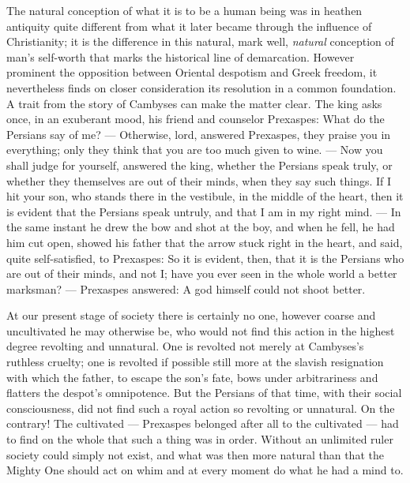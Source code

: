 \documentclass[12pt,a4paper,openany]{book}
\newcommand{\opage}[1]{\marginnote{\footnotesize\textit{[#1]}}}
\begin{document}
The natural conception of what it is to be a human being
was in heathen antiquity quite different from
what it later became through the influence of Christianity; it is
the difference in this natural, mark well, \emph{natural}
conception of man's self-worth that marks the
historical line of demarcation. However prominent the opposition
between Oriental despotism and
Greek freedom, it nevertheless finds on closer
\setcounter{footnote}{0}%
\opage{295}consideration its resolution in a common foundation. A trait
from the story of Cambyses can make the matter clear.
The king asks once, in an exuberant mood, his friend and counselor
Prexaspes: What do the Persians say of me? ---
Otherwise, lord, answered Prexaspes, they praise you in everything;
only they think that you are too much given to wine. ---
Now you shall judge for yourself, answered the king, whether the Persians
speak truly, or whether they themselves are out of their minds, when they
say such things. If I hit your son, who stands
there in the vestibule, in the middle of the heart, then it is evident that
the Persians speak untruly, and that I am in my right mind.
--- In the same instant he drew the bow and shot at
the boy, and when he fell, he had him cut open, showed
his father that the arrow stuck right in the heart, and said, quite self-satisfied,
to Prexaspes: So it is evident, then, that it is the Persians
who are out of their minds, and not I; have you ever seen in
the whole world a better marksman? --- Prexaspes answered:
A god himself could not shoot better.

At our present stage of society there is certainly no one,
however coarse and uncultivated he may otherwise be, who
would not find this action in the highest degree revolting
and unnatural. One is revolted not merely at Cambyses's
ruthless cruelty; one is revolted if possible still more
at the slavish resignation with which the father,
to escape the son's fate, bows under arbitrariness
and flatters the despot's omnipotence. But the Persians
of that time, with their social consciousness, did
not find such a royal action so revolting or
unnatural. On the contrary! The cultivated --- Prexaspes belonged
after all to the cultivated --- had to find on the whole that such a thing
was in order. Without an unlimited ruler society could
\setcounter{footnote}{0}%
\opage{296}simply not exist, and what was then more natural
than that the Mighty One should act on whim
and at every moment do what he had a mind to.
\end{document}
